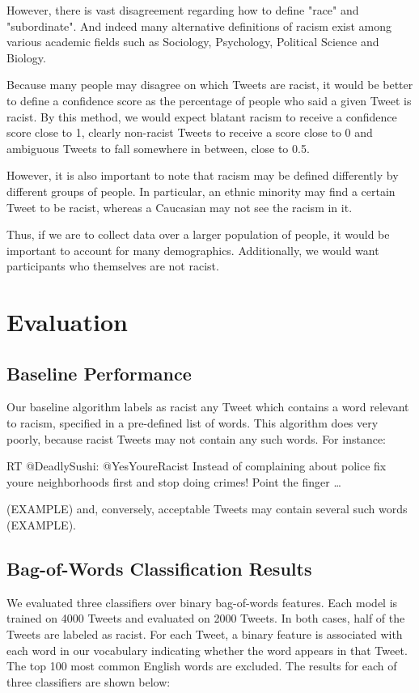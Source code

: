 \documentclass[]{article}
\begin{document}
However, there is vast disagreement regarding how to define "race" and "subordinate". And indeed many alternative definitions of racism exist among various academic fields such as Sociology, Psychology, Political Science and Biology.

Because many people may disagree on which Tweets are racist, it would be better to define a confidence score as the percentage of people who said a given Tweet is racist. By this method, we would expect blatant racism to receive a confidence score close to 1, clearly non-racist Tweets to receive a score close to 0 and ambiguous Tweets to fall somewhere in between, close to 0.5.

However, it is also important to note that racism may be defined differently by different groups of people. In particular, an ethnic minority may find a certain Tweet to be racist, whereas a Caucasian may not see the racism in it.

Thus, if we are to collect data over a larger population of people, it would be important to account for many demographics. Additionally, we would want participants who themselves are not racist.

\section{Evaluation}
\subsection{Baseline Performance}

Our baseline algorithm labels as racist any Tweet which contains a word relevant to racism, specified in a pre-defined list of words. This algorithm does very poorly, because racist Tweets may not contain any such words. For instance:

	RT @DeadlySushi: @YesYoureRacist Instead of complaining about police fix youre neighborhoods first and stop doing crimes! Point the finger …
	
 (EXAMPLE) and, conversely, acceptable Tweets may contain several such words (EXAMPLE).


\subsection{Bag-of-Words Classification Results}

We evaluated three classifiers over binary bag-of-words features. Each model is trained on 4000 Tweets and evaluated on 2000 Tweets. In both cases, half of the Tweets are labeled as racist. For each Tweet, a binary feature is associated with each word in our vocabulary indicating whether the word appears in that Tweet. The top 100 most common English words are excluded. The results for each of three classifiers are shown below:
\end{document}
